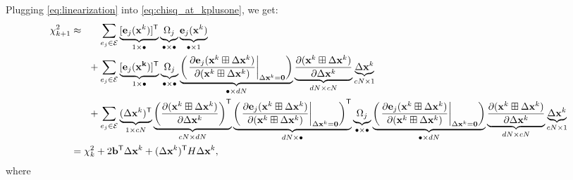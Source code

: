 \documentclass{article}
\newcommand{\transp}{{\scriptstyle{\mathsf{T}}}}
\begin{document}
%
Plugging \eqref{eq:linearization} into \eqref{eq:chisq_at_kplusone}, we get:
%
\small
\begin{align}
    \chi_{k+1}^2 &\approx \ \ \ \ \ \sum_{e_j \in \mathcal{E}} \underbrace{[ \mathbf{e}_j(\mathbf{x}^k)]^\transp}_{1 \times \bullet} \underbrace{\Omega_j}_{\bullet \times \bullet} \underbrace{\mathbf{e}_j(\mathbf{x}^k)}_{\bullet \times 1} \notag \\
    &\hphantom{\approx} \ \ \ + \sum_{e_j \in \mathcal{E}} \underbrace{[ \mathbf{e}_j(\mathbf{x^k}) ]^\transp }_{1 \times \bullet} \underbrace{\Omega_j}_{\bullet \times \bullet} \underbrace{\left( \left. \frac{\partial \mathbf{e}_j(\mathbf{x}^k \boxplus \Delta \mathbf{x}^k)}{\partial (\mathbf{x}^k \boxplus \Delta \mathbf{x}^k)} \right|_{\Delta \mathbf{x}^k = \mathbf{0}} \right)}_{\bullet \times dN} \underbrace{\frac{\partial (\mathbf{x}^k \boxplus \Delta \mathbf{x}^k)}{\partial \Delta \mathbf{x}^k}}_{dN \times cN} \underbrace{\Delta \mathbf{x}^k}_{cN \times 1} \notag \\
    &\hphantom{\approx} \ \ \ + \sum_{e_j \in \mathcal{E}} \underbrace{(\Delta \mathbf{x}^k)^\transp}_{1 \times cN} \underbrace{ \left( \frac{\partial (\mathbf{x}^k \boxplus \Delta \mathbf{x}^k)}{\partial \Delta \mathbf{x}^k} \right)^\transp}_{cN \times dN} \underbrace{\left( \left. \frac{\partial \mathbf{e}_j(\mathbf{x}^k \boxplus \Delta \mathbf{x}^k)}{\partial (\mathbf{x}^k \boxplus \Delta \mathbf{x}^k)} \right|_{\Delta \mathbf{x}^k = \mathbf{0}} \right)^\transp}_{dN \times \bullet} \underbrace{\Omega_j}_{\bullet \times \bullet} \underbrace{\left( \left. \frac{\partial \mathbf{e}_j(\mathbf{x}^k \boxplus \Delta \mathbf{x}^k)}{\partial (\mathbf{x}^k \boxplus \Delta \mathbf{x}^k)} \right|_{\Delta \mathbf{x}^k = \mathbf{0}} \right)}_{\bullet \times dN} \underbrace{\frac{\partial (\mathbf{x}^k \boxplus \Delta \mathbf{x}^k)}{\partial \Delta \mathbf{x}^k}}_{dN \times cN} \underbrace{\Delta \mathbf{x}^k}_{cN \times 1} \notag \\
    &= \chi_k^2 + 2 \mathbf{b}^\transp \Delta \mathbf{x}^k + (\Delta \mathbf{x}^k)^\transp H \Delta \mathbf{x}^k,  \notag
\end{align}
\normalsize
%
where
%
\end{document}
